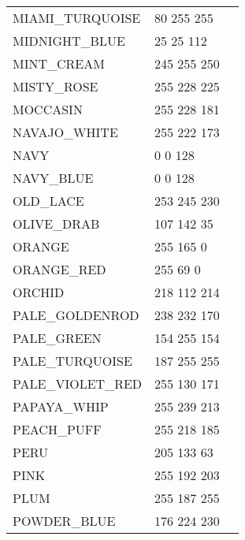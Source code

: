 \documentclass{article}
\begin{document}
\begin{longtable}{lll}
MIAMI\_TURQUOISE & 80 255 255 & \colorbox[RGB]{80 255 255}{\phantom{MMMMMMMM}}\\
MIDNIGHT\_BLUE & 25 25 112 & \colorbox[RGB]{25 25 112}{\phantom{MMMMMMMM}}\\
MINT\_CREAM & 245 255 250 & \colorbox[RGB]{245 255 250}{\phantom{MMMMMMMM}}\\
MISTY\_ROSE & 255 228 225 & \colorbox[RGB]{255 228 225}{\phantom{MMMMMMMM}}\\
MOCCASIN & 255 228 181 & \colorbox[RGB]{255 228 181}{\phantom{MMMMMMMM}}\\
NAVAJO\_WHITE & 255 222 173 & \colorbox[RGB]{255 222 173}{\phantom{MMMMMMMM}}\\
NAVY & 0 0 128 & \colorbox[RGB]{0 0 128}{\phantom{MMMMMMMM}}\\
NAVY\_BLUE & 0 0 128 & \colorbox[RGB]{0 0 128}{\phantom{MMMMMMMM}}\\
OLD\_LACE & 253 245 230 & \colorbox[RGB]{253 245 230}{\phantom{MMMMMMMM}}\\
OLIVE\_DRAB & 107 142 35 & \colorbox[RGB]{107 142 35}{\phantom{MMMMMMMM}}\\
ORANGE & 255 165 0 & \colorbox[RGB]{255 165 0}{\phantom{MMMMMMMM}}\\
ORANGE\_RED & 255 69 0 & \colorbox[RGB]{255 69 0}{\phantom{MMMMMMMM}}\\
ORCHID & 218 112 214 & \colorbox[RGB]{218 112 214}{\phantom{MMMMMMMM}}\\
PALE\_GOLDENROD & 238 232 170 & \colorbox[RGB]{238 232 170}{\phantom{MMMMMMMM}}\\
PALE\_GREEN & 154 255 154 & \colorbox[RGB]{154 255 154}{\phantom{MMMMMMMM}}\\
PALE\_TURQUOISE & 187 255 255 & \colorbox[RGB]{187 255 255}{\phantom{MMMMMMMM}}\\
PALE\_VIOLET\_RED & 255 130 171 & \colorbox[RGB]{255 130 171}{\phantom{MMMMMMMM}}\\
PAPAYA\_WHIP & 255 239 213 & \colorbox[RGB]{255 239 213}{\phantom{MMMMMMMM}}\\
PEACH\_PUFF & 255 218 185 & \colorbox[RGB]{255 218 185}{\phantom{MMMMMMMM}}\\
PERU & 205 133 63 & \colorbox[RGB]{205 133 63}{\phantom{MMMMMMMM}}\\
PINK & 255 192 203 & \colorbox[RGB]{255 192 203}{\phantom{MMMMMMMM}}\\
PLUM & 255 187 255 & \colorbox[RGB]{255 187 255}{\phantom{MMMMMMMM}}\\
POWDER\_BLUE & 176 224 230 & \colorbox[RGB]{176 224 230}{\phantom{MMMMMMMM}}\\

\end{longtable}
\end{document}
